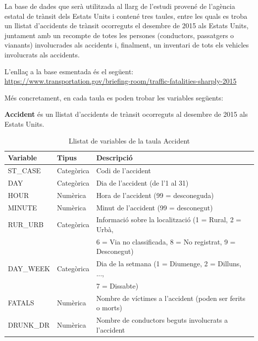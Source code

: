 \documentclass[12pt,longbibliography]{article}
\theoremstyle{definition}
\theoremstyle{remark}
\begin{document}
La base de dades que serà utilitzada al llarg de l'estudi provené de l'agència estatal de trànsit dels Estats Units i contené tres taules, entre les quals es troba un llistat d’accidents de trànsit ocorreguts el desembre de 2015 als Estats Units, juntament amb un recompte de totes les persones (conductors, passatgers o vianants) involucrades als accidents i, finalment, un inventari de tots els vehicles involucrats als accidents. 


L'enllaç a la base esmentada és el següent:  \url{https://www.transportation.gov/briefing-room/traffic-fatalities-sharply-2015}


Més concretament, en cada taula es poden trobar les variables següents:


\textbf{Accident} és un llistat d’accidents de trànsit ocorreguts al desembre de 2015 als Estats Units.

\begin{table}[H]
\centering
\begin{tabular}{|l|l|l|}
\hline
\textbf{Variable} & \textbf{Tipus} & \textbf{Descripció}                                  \\\hline
ST\_CASE          & Categòrica     & Codi de l’accident                                   \\
DAY               & Categòrica     & Dia de l’accident (de l’1 al 31)                     \\
HOUR              & Numèrica       & Hora de l’accident (99 = desconeguda)                \\
MINUTE            & Numèrica       & Minut de l’accident (99 = desconegut)                \\
RUR\_URB  & Categòrica & Informació sobre la localització (1 = Rural, 2 = Urbà,  \\
   &   & 6 = Via no classificada, 8 = No registrat, 9 = Desconegut) \\
DAY\_WEEK & Categòrica & Dia de la setmana (1 = Diumenge, 2 = Dilluns, ...,                                              \\
  &   &  7 = Dissabte)                                                  \\
FATALS            & Numèrica       & Nombre de víctimes a l’accident   (poden ser ferits o morts)                     \\
DRUNK\_DR          & Numèrica       & Nombre de conductors beguts involucrats a l’accident \\\hline
\end{tabular}
\caption{\label{accident-table}Llistat de variables de la taula Accident}
\end{table}
\end{document}
